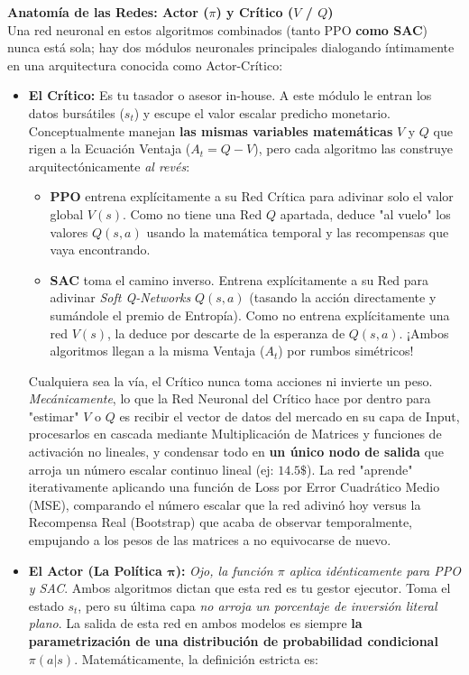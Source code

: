 \documentclass[11pt]{article}
\begin{document}
\vspace{4mm}
\noindent\textbf{Anatomía de las Redes: Actor ($\pi$) y Crítico ($V$ / $Q$)} \\
Una red neuronal en estos algoritmos combinados (tanto PPO \textbf{como SAC}) nunca está sola; hay dos módulos neuronales principales dialogando íntimamente en una arquitectura conocida como Actor-Crítico:
\begin{itemize}
    \item \textbf{El Crítico:} Es tu tasador o asesor in-house. A este módulo le entran los datos bursátiles ($s_t$) y escupe el valor escalar predicho monetario. Conceptualmente manejan \textbf{las mismas variables matemáticas} $V$ y $Q$ que rigen a la Ecuación Ventaja ($A_t = Q - V$), pero cada algoritmo las construye arquitectónicamente \textit{al revés}:
    \begin{itemize}
        \item \textbf{PPO} entrena explícitamente a su Red Crítica para adivinar solo el valor global $V(s)$. Como no tiene una Red $Q$ apartada, deduce "al vuelo" los valores $Q(s,a)$ usando la matemática temporal y las recompensas que vaya encontrando.
        \item \textbf{SAC} toma el camino inverso. Entrena explícitamente a su Red para adivinar \textit{Soft Q-Networks} $Q(s,a)$ (tasando la acción directamente y sumándole el premio de Entropía). Como no entrena explícitamente una red $V(s)$, la deduce por descarte de la esperanza de $Q(s,a)$. ¡Ambos algoritmos llegan a la misma Ventaja ($A_t$) por rumbos simétricos!
    \end{itemize}
    Cualquiera sea la vía, el Crítico nunca toma acciones ni invierte un peso. \textit{Mecánicamente}, lo que la Red Neuronal del Crítico hace por dentro para "estimar" $V$ o $Q$ es recibir el vector de datos del mercado en su capa de Input, procesarlos en cascada mediante Multiplicación de Matrices y funciones de activación no lineales, y condensar todo en \textbf{un único nodo de salida} que arroja un número escalar continuo lineal (ej: $14.5\$$). La red "aprende" iterativamente aplicando una función de Loss por Error Cuadrático Medio (MSE), comparando el número escalar que la red adivinó hoy versus la Recompensa Real (Bootstrap) que acaba de observar temporalmente, empujando a los pesos de las matrices a no equivocarse de nuevo.
    \item \textbf{El Actor (La Política $\boldsymbol{\pi}$):} \textit{Ojo, la función $\pi$ aplica idénticamente para PPO y SAC}. Ambos algoritmos dictan que esta red es tu gestor ejecutor. Toma el estado $s_t$, pero su última capa \textit{no arroja un porcentaje de inversión literal plano}. La salida de esta red en ambos modelos es siempre \textbf{la parametrización de una distribución de probabilidad condicional $\pi(a|s)$}. Matemáticamente, la definición estricta es:

\end{itemize}
\end{document}
